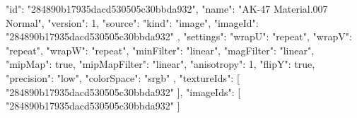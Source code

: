 {
  "id": "284890b17935dacd530505c30bbda932",
  "name": "AK-47 Material.007 Normal",
  "version": 1,
  "source": {
    "kind": "image",
    "imageId": "284890b17935dacd530505c30bbda932"
  },
  "settings": {
    "wrapU": "repeat",
    "wrapV": "repeat",
    "wrapW": "repeat",
    "minFilter": "linear",
    "magFilter": "linear",
    "mipMap": true,
    "mipMapFilter": "linear",
    "anisotropy": 1,
    "flipY": true,
    "precision": "low",
    "colorSpace": "srgb"
  },
  "textureIds": [
    "284890b17935dacd530505c30bbda932"
  ],
  "imageIds": [
    "284890b17935dacd530505c30bbda932"
  ]
}
